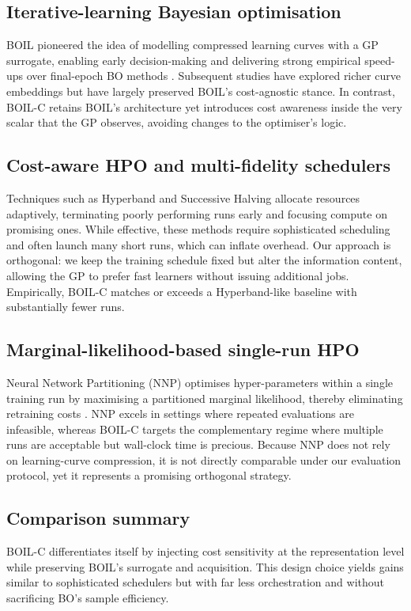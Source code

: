 \documentclass{article} %
\begin{document}
\subsection{Iterative-learning Bayesian optimisation}
BOIL pioneered the idea of modelling compressed learning curves with a GP surrogate, enabling early decision-making and delivering strong empirical speed-ups over final-epoch BO methods \@.\cite{nguyen-2019-bayesian} Subsequent studies have explored richer curve embeddings but have largely preserved BOIL’s cost-agnostic stance. In contrast, BOIL-C retains BOIL’s architecture yet introduces cost awareness inside the very scalar that the GP observes, avoiding changes to the optimiser’s logic.

\subsection{Cost-aware HPO and multi-fidelity schedulers}
Techniques such as Hyperband and Successive Halving allocate resources adaptively, terminating poorly performing runs early and focusing compute on promising ones. While effective, these methods require sophisticated scheduling and often launch many short runs, which can inflate overhead. Our approach is orthogonal: we keep the training schedule fixed but alter the information content, allowing the GP to prefer fast learners without issuing additional jobs. Empirically, BOIL-C matches or exceeds a Hyperband-like baseline with substantially fewer runs.

\subsection{Marginal-likelihood-based single-run HPO}
Neural Network Partitioning (NNP) optimises hyper-parameters within a single training run by maximising a partitioned marginal likelihood, thereby eliminating retraining costs \@.\cite{mlodozeniec-2023-hyperparameter} NNP excels in settings where repeated evaluations are infeasible, whereas BOIL-C targets the complementary regime where multiple runs are acceptable but wall-clock time is precious. Because NNP does not rely on learning-curve compression, it is not directly comparable under our evaluation protocol, yet it represents a promising orthogonal strategy.

\subsection{Comparison summary}
BOIL-C differentiates itself by injecting cost sensitivity at the representation level while preserving BOIL’s surrogate and acquisition. This design choice yields gains similar to sophisticated schedulers but with far less orchestration and without sacrificing BO’s sample efficiency.
\end{document}
